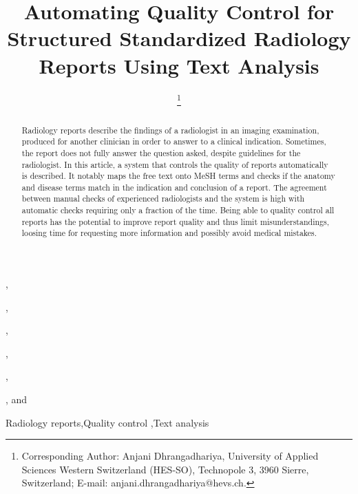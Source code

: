 \documentclass{IOS-Book-Article}
\begin{document}
\begin{frontmatter}              
%
\title{Automating Quality Control
for Structured Standardized Radiology Reports Using Text Analysis}
%
\author[A]{ %
\thanks{Corresponding Author: Anjani Dhrangadhariya, University of Applied Sciences Western Switzerland (HES-SO), Technopole 3,
3960 Sierre, Switzerland; E-mail:
anjani.dhrangadhariya@hevs.ch.}},
\author[A]{ },
\author[B]{ },
\author[B]{ },
\author[B]{ },
\author[A,C]{ },
and
\author[B]{ }

%
\address[A]{University of Applied Sciences Western Switzerland (HES-SO), Sierre, Switzerland}
\address[B]{Institut de Radiologie de Sion (IRS), Groupe 3R, Sion, Switzerland}
\address[C]{University of Geneva, Geneva, Switzerland}
%
\begin{abstract}
%
Radiology reports describe the findings of a radiologist in an imaging examination, produced for another clinician in order to answer to a clinical indication. Sometimes, the report does not fully answer the question asked, despite guidelines for the radiologist.
In this article, a system that controls the quality of reports automatically is described. It notably maps the free text onto MeSH terms and checks if the anatomy and disease terms match in the indication and conclusion of a report.
The agreement between manual checks of experienced radiologists and the system is high with automatic checks requiring only a fraction of the time.
Being able to quality control all reports has the potential to improve report quality and thus limit misunderstandings, loosing time for requesting more information and possibly avoid medical mistakes.
%
\end{abstract}
%
\begin{keyword}
Radiology reports\sep Quality control \sep Text analysis
\end{keyword}
\end{frontmatter}
%
\thispagestyle{empty}
\pagestyle{empty}
\end{document}

